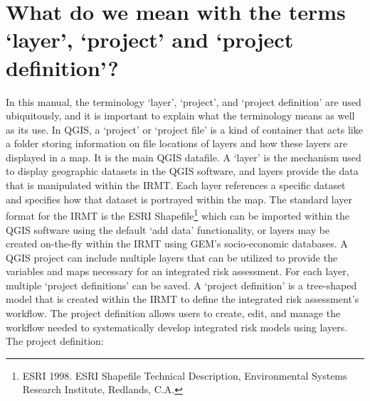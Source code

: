\section{What do we mean with the terms `layer', `project' and `project definition'?}
\label{sec:definitions}

In this manual, the terminology `layer', `project', and `project definition'
are used ubiquitously, and it is important to explain what the terminology
means as well as its use. In QGIS, a `project' or `project file' is a kind of
container that acts like a folder storing information on file locations of
layers and how these layers are displayed in a map. It is the main QGIS
datafile. A `layer' is the mechanism used to display geographic datasets in the
QGIS software, and layers provide the data that is manipulated within the
IRMT\@.  Each layer references a specific dataset and specifies how that
dataset is portrayed within the map. The standard layer format for the IRMT is
the ESRI Shapefile\footnote{ESRI 1998. ESRI Shapefile Technical Description,
Environmental Systems Research Institute, Redlands, C.A.} which can be imported
within the QGIS software using the default `add data' functionality, or layers
may be created on-the-fly within the IRMT using GEM's socio-economic databases.
A QGIS project can include multiple layers that can be utilized to provide the
variables and maps necessary for an integrated risk assessment. For each layer,
multiple `project definitions' can be saved. A `project definition' is a
tree-shaped model that is created within the IRMT to define the integrated risk
assessment's workflow. The project definition allows users to create, edit, and
manage the workflow needed to systematically develop integrated risk models
using layers. The project definition:

